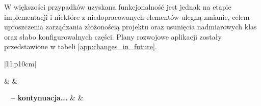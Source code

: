 W większości przypadków uzyskana funkcjonalność jest jednak na etapie implementacji i niektóre z niedopracowanych elementów 
ulegną zmianie, celem uproszczenia zarządzania złożonością projektu oraz usunięcia nadmiarowych klas oraz słabo
konfigurowalnych części.
Plany rozwojowe aplikacji zostały przedstawione w tabeli \ref{app:changes_in_future}.
\begin{center}
	\begin{longtable}{|l|l|p{10cm}|}
		\caption[Plany rozwojowe aplikacji demonstracyjnej]{
			Plany rozwojowe aplikacji demonstracyjnej
		}
		\label{app:changes_in_future}
		\tabularnewline	
		
		\hline
			 			&
					&
				\tabularnewline
		\hline
		\endfirsthead
		
		{{\bfseries \tablename\ \thetable{} -- kontynuacja...}} \tabularnewline
		\hline
			 			&
					&
				\tabularnewline
		\hline
		\endhead
			
		\hline
			 \tabularnewline \hline
		\endfoot
		\hline
		\endlastfoot	
		

\end{longtable}
\end{center}
